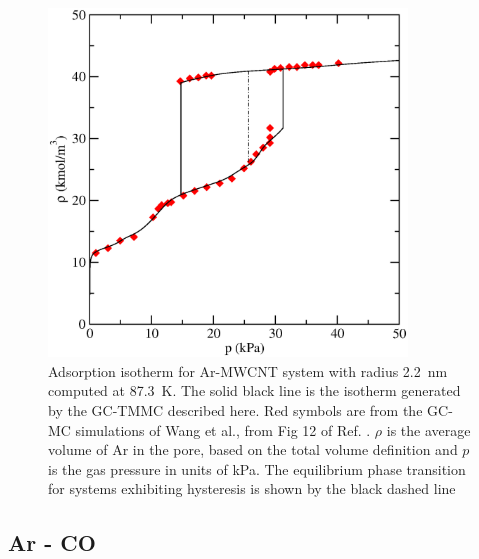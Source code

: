 %
\begin{figure}
 \includegraphics[clip=true,width=0.85\textwidth]{Figures/3MWCNT_44ang}
  \caption{Adsorption isotherm for Ar-MWCNT system with radius 2.2~nm computed at 87.3~K. The solid black line is the isotherm generated by the GC-TMMC described here. Red symbols are from the GC-MC simulations of Wang et al., from Fig 12 of Ref. . $\rho$ is the average volume of Ar in the pore, based on the total volume definition and $p$ is the gas pressure in units of kPa. The equilibrium phase transition for systems exhibiting hysteresis is shown by the black dashed line}
  \label{cs104bundle_isotherm}
\end{figure}
%

\subsection{Ar - CO}

